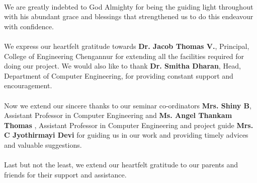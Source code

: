 \documentclass[a4paper,12pt,oneside]{article}
\begin{document}
\paragraph{}
We are greatly indebted to God Almighty for being the guiding light throughout with his
abundant grace and blessings that strengthened us to do this endeavour with confidence.
\paragraph{}
We express our heartfelt gratitude towards \textbf{Dr. Jacob Thomas V.}, Principal, College
of Engineering Chengannur for extending all the facilities required for doing our project.
We would also like to thank \textbf{Dr. Smitha Dharan}, Head, Department of Computer
Engineering, for providing constant support and encouragement.
\paragraph{}
Now we extend our sincere thanks to our seminar co-ordinators \textbf{Mrs. Shiny B}, Assistant
Professor in Computer Engineering and \textbf{Ms. Angel Thankam Thomas} , Assistant
Professor in Computer Engineering and project guide \textbf{Mrs. C Jyothirmayi Devi} for guiding us in our work and providing timely
advices and valuable suggestions.
\paragraph{}
Last but not the least, we extend our heartfelt gratitude to our parents and friends for
their support and assistance.	

\end{document}
